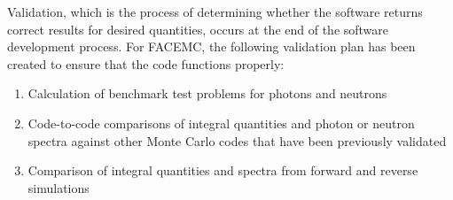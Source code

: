 Validation, which is the process of determining whether the software returns
correct results for desired quantities, occurs at the end of the software 
development process. For FACEMC, the following validation plan has been created 
to ensure that the code functions properly:
\begin{enumerate}
  \item Calculation of benchmark test problems for photons and neutrons
  \item Code-to-code comparisons of integral quantities and photon or neutron 
    spectra against other Monte Carlo codes that have been previously validated
  \item Comparison of integral quantities and spectra from forward and reverse
    simulations
\end{enumerate}

